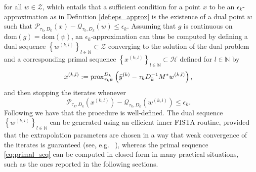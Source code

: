 \documentclass[conference]{IEEEtran}
\begin{document}
for all $w\in\mathcal{Z}$, which entails that a sufficient condition for a point $x$ to be an $\epsilon_{k}$-approximation as in Definition \ref{def:eps_approx} is the existence of a dual point $w$ such that $\mathcal{P}_{\tau_{k},D_{k}}(x) - \mathcal{Q}_{\tau_{k},D_{k}}(w)\leq \epsilon_{k}$. 
Assuming that $g$ is continuous on $\text{dom}(g)=\text{dom}(\psi)$, an $\epsilon_{k}$-approximation can thus be computed by defining a dual sequence $\left\{ w ^{(k,l)}\right\}_{l\in\mathbb{N}}\subset \mathcal{Z}$ converging to the solution of the dual problem and a corresponding primal sequence $\left\{ x ^{(k,l)}\right\}_{l\in\mathbb{N}}\subset \mathcal{H}$ defined for $l\in\mathbb{N}$ by
\begin{equation}
        x^{(k,l)} := \mathrm{prox}_{\tau_{k}\psi}^{D_k}\left(\bar{y}^{(k)} - \tau_{k}D_k^{-1} M^* w^{(k,l)} \right),\label{eq:primal_seq}
\end{equation}
and then stopping the iterates whenever
\begin{equation}  \label{eq:criterion_eps}
\mathcal{P}_{\tau_{k},D_k}(x^{(k,l)}) - \mathcal{Q}_{\tau_{k},D_k}(w^{(k,l)})\leq \epsilon_k.
\end{equation}
Following \cite[Proposition 4.2]{Bonettini2018a} we have that the procedure is well-defined.
The dual sequence $\left\{w^{(k,l)} \right\}_{l\in\mathbb{N}}$ can be generated using an efficient inner FISTA routine, provided that the extrapolation parameters are chosen in a way that weak convergence of the iterates is guaranteed (see, e.g.~ \cite{Chambolle-Dossal-2014}), whereas the primal sequence \eqref{eq:primal_seq} can be computed in closed form in many practical situations, such as the ones reported in the following sections.

\end{document}
